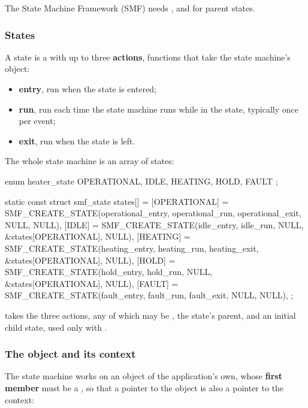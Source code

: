 The State Machine Framework (SMF) needs , and
 for parent states.

\subsubsection{States}
A state is a  with up to three \textbf{actions}, functions that take the
state machine’s object:

\begin{itemize}
  \item \textbf{entry}, run when the state is entered;
  \item \textbf{run}, run each time the state machine runs while in the state, typically once per event;
  \item \textbf{exit}, run when the state is left.
\end{itemize}

The whole state machine is an array of states:

\begin{ccode}
enum heater_state { OPERATIONAL, IDLE, HEATING, HOLD, FAULT };

static const struct smf_state states[] = {
    [OPERATIONAL] = SMF_CREATE_STATE(operational_entry, operational_run,
                                     operational_exit, NULL, NULL),
    [IDLE] = SMF_CREATE_STATE(idle_entry, idle_run, NULL,
                              &states[OPERATIONAL], NULL),
    [HEATING] = SMF_CREATE_STATE(heating_entry, heating_run, heating_exit,
                                 &states[OPERATIONAL], NULL),
    [HOLD] = SMF_CREATE_STATE(hold_entry, hold_run, NULL,
                              &states[OPERATIONAL], NULL),
    [FAULT] = SMF_CREATE_STATE(fault_entry, fault_run, fault_exit, NULL, NULL),
};
\end{ccode}

\noindent {} takes the three actions, any of
which may be , the state’s parent, and an initial child state, used only with
.

\subsubsection{The object and its context}
The state machine works on an object of the application’s own, whose \textbf{first member} must be a
, so that a pointer to the object is also a pointer to the context:

